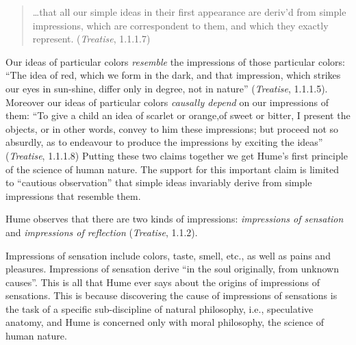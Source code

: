 \begin{quote}
    \ldots that all our simple ideas in their first appearance are deriv'd from simple impressions, which are correspondent to them, and which they exactly represent. (\emph{Treatise}, 1.1.1.7)
\end{quote}

Our ideas of particular colors \emph{resemble} the impressions of those particular colors: ``The idea of red, which we form in the dark, and that impression, which strikes our eyes in sun-shine, differ only in degree, not in nature'' (\emph{Treatise}, 1.1.1.5). Moreover our ideas of particular colors \emph{causally depend} on our impressions of them: ``To give a child an idea of scarlet or orange,of sweet or bitter, I present the objects, or in other words, convey to him these impressions; but proceed not so absurdly, as to endeavour to produce the impressions by exciting the ideas'' (\emph{Treatise}, 1.1.1.8) Putting these two claims together we get Hume's first principle of the science of human nature. The support for this important claim is limited to ``cautious observation'' that simple ideas invariably derive from simple impressions that resemble them. \change

% 


Hume observes that there are two kinds of impressions: \emph{impressions of sensation} and \emph{impressions of reflection} (\emph{Treatise}, 1.1.2).

Impressions of sensation include colors, taste, smell, etc., as well as pains and pleasures. Impressions of sensation derive ``in the soul originally, from unknown causes''. This is all that Hume ever says about the origins of impressions of sensations. This is because discovering the cause of impressions of sensations is the task of a specific sub-discipline of natural philosophy, i.e., speculative anatomy, and Hume is concerned only with moral philosophy, the science of human nature.

